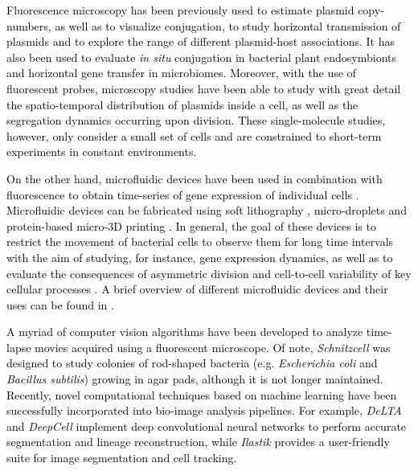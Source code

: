 \documentclass[fleqn,12pt]{wlscirep}
\newcommand{\blue}[1]{\textcolor{black}{#1}}
\begin{document}
\blue{Fluorescence microscopy has been previously used to estimate plasmid copy-numbers\cite{ng2010plasmid,lobner1999distribution}, as well as to visualize conjugation\cite{babic2008direct}, to study horizontal transmission of plasmids\cite{del2012determination} and to explore the range of different plasmid-host associations\cite{shintani2014single}. It has also been used to evaluate {\em in situ} conjugation in bacterial plant endosymbionts\cite{banuelos2019conjugative} and horizontal gene transfer in microbiomes\cite{pinilla2018monitoring}.
Moreover, with the use of fluorescent probes, microscopy studies have been able to study with great detail the spatio-temporal distribution of plasmids inside a cell, as well as the segregation dynamics occurring upon division\cite{Reyes2013,Hsu2019,wang2016quantitative}.  These single-molecule studies, however, only consider a small set of cells and are constrained to short-term experiments in constant environments.}

\blue{On the other hand, microfluidic devices have been used in combination with fluorescence to obtain time-series of gene expression of individual cells \cite{Young2012,tomanek2020gene}.  Microfluidic devices can be fabricated using soft lithography \cite{zhang2012inkjet,pan2011maskless}, micro-droplets \cite{boedicker2009microfluidic} and protein-based micro-3D printing \cite{connell2014real}. In general, the goal of these devices is to restrict the movement of bacterial cells to observe them for long time intervals with the aim of studying, for instance, gene expression dynamics\cite{Young2012,baumgart2017synchronized,bennett2009microfluidic,locke2009using}, as well as to evaluate the consequences of asymmetric division and cell-to-cell variability of key cellular processes \cite{mosheiff2017correlations,bergmiller2017biased,el2018heterogeneity}.
A brief overview of different microfluidic devices and their uses can be found in \cite{bennett2009microfluidic,potvin2018microfluidics}. }

\blue{A myriad of computer vision algorithms have been developed to analyze time-lapse movies acquired using a fluorescent microscope\cite{Young2012,vanValen2016,Berg2019,balomenos2017image,arnoldini2014bistable,sachs2016image,lugagne2019delta,kamentsky2011improved}.  Of note, {\em Schnitzcell}\cite{Young2012} was designed to study colonies of rod-shaped bacteria (e.g. {\em Escherichia coli} and {\em Bacillus subtilis}) growing in agar pads, although it is not longer maintained.  Recently, novel computational techniques based on machine learning have been successfully incorporated into bio-image analysis pipelines. For example, {\em DeLTA}\cite{lugagne2019delta} and {\em DeepCell}\cite{vanValen2016} implement deep convolutional neural networks to perform accurate segmentation and lineage reconstruction, while {\em Ilastik}\cite{berg2019ilastik} provides a user-friendly suite for image segmentation and cell tracking. }
\end{document}
